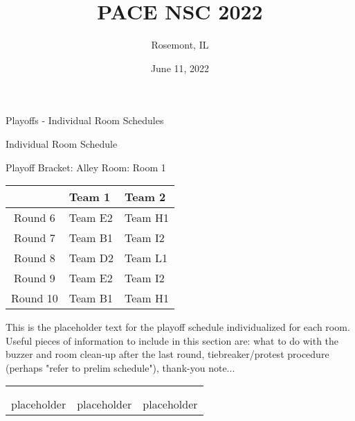 \documentclass{article}%
\title{PACE NSC 2022}%
\author{Rosemont, IL}%
\date{June 11, 2022}%
\begin{document}
%
\normalsize%
%
\maketitle%
\vspace*{48pt}%
\begin{center}%
\begin{Huge}%
Playoffs {-} Individual Room Schedules%
\end{Huge}%
\end{center}%
\newpage%
\pagestyle{fancy}%
\fancyhf{}%
%
%
%
\begin{center}%
\begin{Huge}%
Individual Room Schedule%
\end{Huge}%
\vspace*{16pt}%
\linebreak%
\begin{Large}%
Playoff Bracket: Alley \hfill Room: Room 1%
\end{Large}%
\end{center}%
%
\begin{tabularx}{\textwidth}{|c|Y|Y|}%
\hline%
&Team 1&Team 2\\%
\hline%
Round 6&Team E2&Team H1\\%
Round 7&Team B1&Team I2\\%
Round 8&Team D2&Team L1\\%
Round 9&Team E2&Team I2\\%
Round 10&Team B1&Team H1\\%
\hline%
\end{tabularx}%
\vspace*{16pt}%
\linebreak%
This is the placeholder text for the playoff schedule individualized for each room. Useful pieces of information to include in this section are: what to do with the buzzer and room clean{-}up after the last round, tiebreaker/protest procedure (perhaps "refer to prelim schedule"), thank{-}you note...%
\vspace*{30pt}%
\newline%
%
\begin{tabularx}{\textwidth}{YYY}%
  &  &  \\%
\\%
placeholder&placeholder&placeholder\\%
\end{tabularx}%
\end{document}
